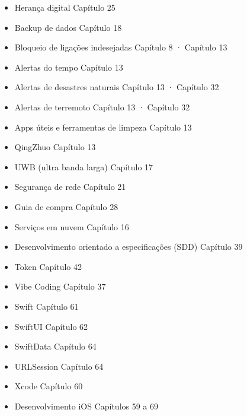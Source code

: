 \begin{itemize}
  \item Herança digital Capítulo 25
  \item Backup de dados Capítulo 18
  \item Bloqueio de ligações indesejadas Capítulo 8 · Capítulo 13
  \item Alertas do tempo Capítulo 13
  \item Alertas de desastres naturais Capítulo 13 · Capítulo 32
  \item Alertas de terremoto Capítulo 13 · Capítulo 32
  \item Apps úteis e ferramentas de limpeza Capítulo 13
  \item QingZhuo Capítulo 13
  \item UWB (ultra banda larga) Capítulo 17
  \item Segurança de rede Capítulo 21
  \item Guia de compra Capítulo 28
  \item Serviços em nuvem Capítulo 16
  \item Desenvolvimento orientado a especificações (SDD) Capítulo 39
  \item Token Capítulo 42
  \item Vibe Coding Capítulo 37
  \item Swift Capítulo 61
  \item SwiftUI Capítulo 62
  \item SwiftData Capítulo 64
  \item URLSession Capítulo 64
  \item Xcode Capítulo 60
  \item Desenvolvimento iOS Capítulos 59 a 69
\end{itemize}


